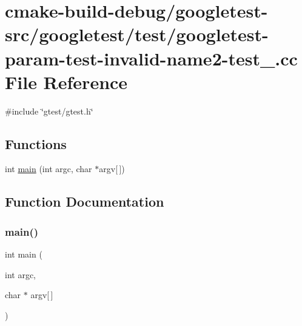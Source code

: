 \hypertarget{googletest-param-test-invalid-name2-test___8cc}{}\section{cmake-\/build-\/debug/googletest-\/src/googletest/test/googletest-\/param-\/test-\/invalid-\/name2-\/test\+\_\+.cc File Reference}
\label{googletest-param-test-invalid-name2-test___8cc}
{\ttfamily \#include \char`\"{}gtest/gtest.\+h\char`\"{}}\newline
\subsection*{Functions}
\begin{DoxyCompactItemize}
\item 
int \mbox{\hyperlink{googletest-param-test-invalid-name2-test___8cc_a0ddf1224851353fc92bfbff6f499fa97}{main}} (int argc, char $\ast$argv\mbox{[}$\,$\mbox{]})
\end{DoxyCompactItemize}


\subsection{Function Documentation}
\mbox{\label{googletest-param-test-invalid-name2-test___8cc_a0ddf1224851353fc92bfbff6f499fa97}} 
\subsubsection{\texorpdfstring{main()}{main()}}
{\footnotesize\ttfamily int main (\begin{DoxyParamCaption}\item[{int}]{argc,  }\item[{char $\ast$}]{argv\mbox{[}$\,$\mbox{]} }\end{DoxyParamCaption})}

